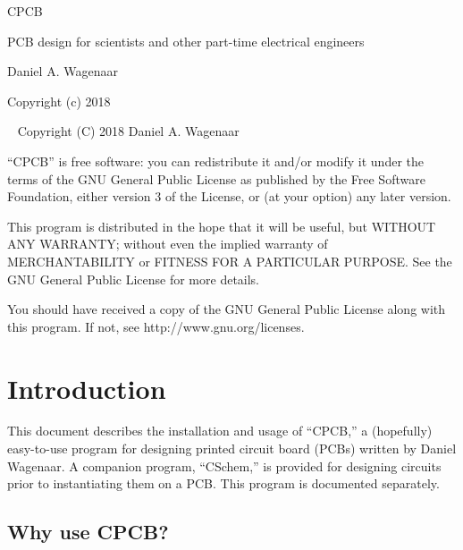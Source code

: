 \documentclass[11pt]{report}
\begin{document}
\thispagestyle{empty}
\begin{centering}
  {\Huge CPCB}
  \vskip30pt

  {\large PCB design for scientists and other part-time electrical engineers}
  \vskip60pt

  {\large Daniel A. Wagenaar}
  \vfill
  
  {Copyright (c) 2018}
  
\end{centering}
\pagebreak
~
\vfill
\noindent Copyright (C) 2018 Daniel A. Wagenaar\medskip

``CPCB'' is free software: you can redistribute it and/or modify
it under the terms of the GNU General Public License as published by
the Free Software Foundation, either version 3 of the License, or
(at your option) any later version.

This program is distributed in the hope that it will be useful,
but WITHOUT ANY WARRANTY; without even the implied warranty of
MERCHANTABILITY or FITNESS FOR A PARTICULAR PURPOSE.  See the
GNU General Public License for more details.

You should have received a copy of the GNU General Public License
along with this program.  If not, see http://www.gnu.org/licenses.
\pagebreak

\chapter{Introduction}

This document describes the installation and usage of ``CPCB,'' a
(hopefully) easy-to-use program for designing printed circuit board
(PCBs) written by Daniel Wagenaar. A companion program, ``CSchem,'' is
provided for designing circuits prior to instantiating them on a
PCB. This program is documented separately.

\section{Why use CPCB?}
\end{document}
